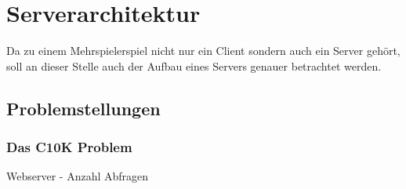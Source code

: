 \chapter{Serverarchitektur}
\label{cha:ext_server}
Da zu einem Mehrspielerspiel nicht nur ein Client sondern auch ein Server gehört, soll an dieser Stelle auch der Aufbau eines Servers genauer betrachtet werden. 


\section{Problemstellungen} 

\subsection{Das C10K Problem} 
Webserver - Anzahl Abfragen